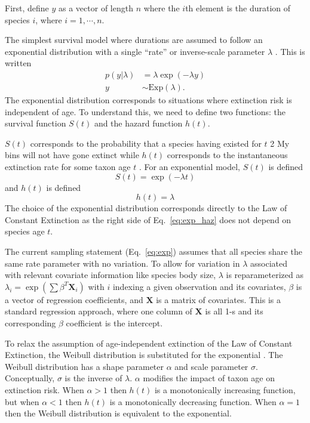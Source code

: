 \documentclass{pnastwo}
\begin{document}
\begin{article}
\begin{materials}
First, define \(y\) as a vector of length \(n\) where the \(i\)th element is the duration of species \(i\), where \(i = 1,\cdots,n\).

The simplest survival model where durations are assumed to follow an exponential distribution with a single ``rate'' or inverse-scale parameter \(\lambda\) \cite{Klein2003}. This is written
\begin{align}
  p(y | \lambda) &= \lambda \exp(-\lambda y) \nonumber \\
  y &\sim \mathrm{Exp}(\lambda).
  \label{eq:exp}
\end{align}
The exponential distribution corresponds to situations where extinction risk is independent of age. To understand this, we need to define two functions: the survival function \(S(t)\) and the hazard function \(h(t)\). 

\(S(t)\) corresponds to the probability that a species having existed for \(t\) 2 My bins will not have gone extinct while \(h(t)\) corresponds to the instantaneous extinction rate for some taxon age \(t\) \cite{Klein2003}. For an exponential model, \(S(t)\) is defined
\begin{equation}
  S(t) = \exp(-\lambda t)
  \label{eq:exp_surv}
\end{equation}
and \(h(t)\) is defined
\begin{equation}
  h(t) = \lambda
  \label{eq:exp_haz}
\end{equation}
The choice of the exponential distribution corresponds directly to the Law of Constant Extinction \cite{VanValen1973} as the right side of Eq.~\ref{eq:exp_haz} does not depend on species age \(t\). 

The current sampling statement (Eq.~\ref{eq:exp}) assumes that all species share the same rate parameter with no variation. To allow for variation in \(\lambda\) associated with relevant covariate information like species body size, \(\lambda\) is reparameterized as \(\lambda_{i} = \exp(\sum \beta^{T}\mathbf{X}_{i})\) with \(i\) indexing a given observation and its covariates, \(\beta\) is a vector of regression coefficients, and \(\mathbf{X}\) is a matrix of covariates. This is a standard regression approach, where one column of \(\mathbf{X}\) is all 1-s and its corresponding \(\beta\) coefficient is the intercept. 

To relax the assumption of age-independent extinction of the Law of Constant Extinction, the Weibull distribution is substituted for the exponential \cite{Klein2003}. The Weibull distribution has a shape parameter \(\alpha\) and scale parameter \(\sigma\). Conceptually, \(\sigma\) is the inverse of \(\lambda\). \(\alpha\) modifies the impact of taxon age on extinction risk. When \(\alpha > 1\) then \(h(t)\) is a monotonically increasing function, but when \(\alpha < 1\) then \(h(t)\) is a monotonically decreasing function. When \(\alpha = 1\) then the Weibull distribution is equivalent to the exponential.


\end{materials}
\end{article}
\end{document}
